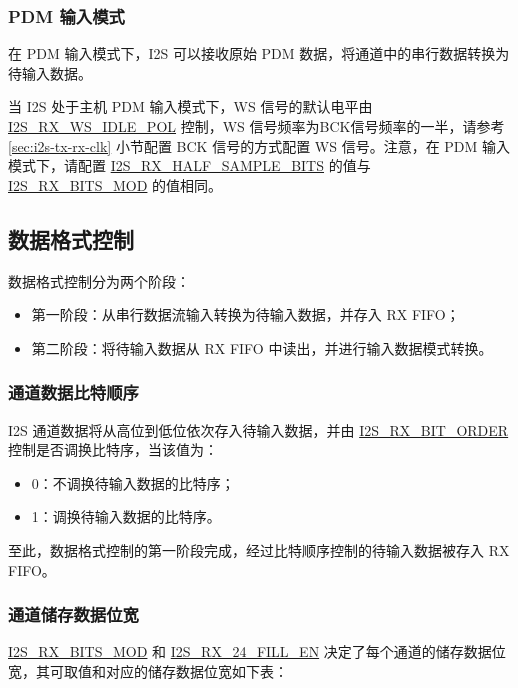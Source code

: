 \documentclass[main\_\_CN.tex]{subfiles}
\begin{document}
\subsubsection{PDM 输入模式} 

在 PDM 输入模式下，I2S 可以接收原始 PDM 数据，将通道中的串行数据转换为待输入数据。

当 I2S 处于主机 PDM 输入模式下，WS 信号的默认电平由 \hyperref[fielddesc:I2SRXWSIDLEPOL]{I2S\_RX\_WS\_IDLE\_POL} 控制，WS 信号频率为BCK信号频率的一半，请参考 \ref{sec:i2s-tx-rx-clk} 小节配置 BCK 信号的方式配置 WS 信号。注意，在 PDM 输入模式下，请配置 \hyperref[fielddesc:I2SRXHALFSAMPLEBITS]{I2S\_RX\_HALF\_SAMPLE\_BITS} 的值与 \hyperref[fielddesc:I2SRXBITSMOD]{I2S\_RX\_BITS\_MOD} 的值相同。

\subsection{数据格式控制}

数据格式控制分为两个阶段：

\begin{itemize}
    \item 第一阶段：从串行数据流输入转换为待输入数据，并存入 RX FIFO；
    \item 第二阶段：将待输入数据从 RX FIFO 中读出，并进行输入数据模式转换。
\end{itemize}

\subsubsection{通道数据比特顺序} 

\chipname{} I2S 通道数据将从高位到低位依次存入待输入数据，并由 \hyperref[fielddesc:I2SRXBITORDER]{I2S\_RX\_BIT\_ORDER} 控制是否调换比特序，当该值为：
\begin{itemize}
\item 0：不调换待输入数据的比特序；
\item 1：调换待输入数据的比特序。
\end{itemize}
至此，数据格式控制的第一阶段完成，经过比特顺序控制的待输入数据被存入 RX FIFO。

\subsubsection{通道储存数据位宽}

\hyperref[fielddesc:I2SRXBITSMOD]{I2S\_RX\_BITS\_MOD} 和 \hyperref[fielddesc:I2SRX24FILLEN]{I2S\_RX\_24\_FILL\_EN} 决定了每个通道的储存数据位宽，其可取值和对应的储存数据位宽如下表：
\end{document}
